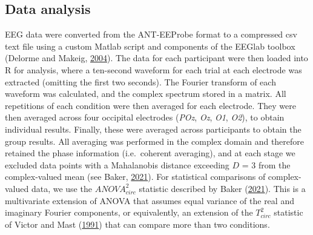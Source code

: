 \documentclass[
]{article}
\begin{document}
\hypertarget{data-analysis}{%
\subsection{Data analysis}\label{data-analysis}}

EEG data were converted from the ANT-EEProbe format to a compressed csv text file using a custom Matlab script and components of the EEGlab toolbox (Delorme and Makeig, \protect\hyperlink{ref-Delorme2004}{2004}). The data for each participant were then loaded into R for analysis, where a ten-second waveform for each trial at each electrode was extracted (omitting the first two seconds). The Fourier transform of each waveform was calculated, and the complex spectrum stored in a matrix. All repetitions of each condition were then averaged for each electrode. They were then averaged across four occipital electrodes (\emph{POz}, \emph{Oz}, \emph{O1}, \emph{O2}), to obtain individual results. Finally, these were averaged across participants to obtain the group results. All averaging was performed in the complex domain and therefore retained the phase information (i.e.~coherent averaging), and at each stage we excluded data points with a Mahalanobis distance exceeding \(D\) = 3 from the complex-valued mean (see Baker, \protect\hyperlink{ref-Baker2021}{2021}). For statistical comparisons of complex-valued data, we use the \(ANOVA^2_{circ}\) statistic described by Baker (\protect\hyperlink{ref-Baker2021}{2021}). This is a multivariate extension of ANOVA that assumes equal variance of the real and imaginary Fourier components, or equivalently, an extension of the \(T^2_{circ}\) statistic of Victor and Mast (\protect\hyperlink{ref-Victor1991}{1991}) that can compare more than two conditions.
\end{document}
